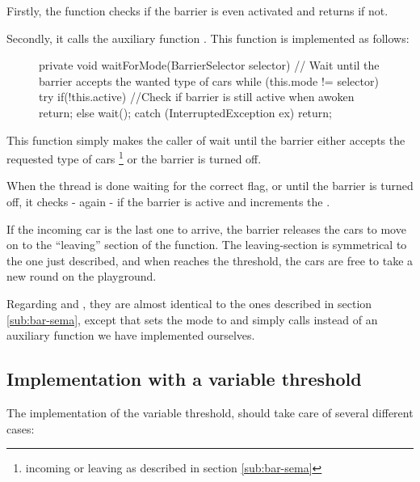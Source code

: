 Firstly, the function checks if the barrier is even activated and
returns if not.

Secondly, it calls the auxiliary function
. This function is implemented as follows:

\begin{figure}[H]
\begin{java}
private void waitForMode(BarrierSelector selector) {
	// Wait until the barrier accepts the wanted type of cars
	while (this.mode != selector) {
		try {
			if(!this.active) //Check if barrier is still active when awoken
				return;
			else
				wait();
		}
		catch (InterruptedException ex) { return; }
	}
}
\end{java}
\caption{}
\label{lst:bar-wait}
\end{figure}

This function simply makes the caller of  wait until the
barrier either accepts the requested type of cars \footnote{incoming
  or leaving as described in section \ref{sub:bar-sema}} or the
barrier is turned off.

When the thread is done waiting for the correct flag, or until the
barrier is turned off, it checks - again - if the barrier is active
and increments the .

If the incoming car is the last one to arrive, the barrier releases
the cars to move on to the ``leaving'' section of the function. The
leaving-section is symmetrical to the one just described, and when
 reaches the threshold, the cars are free to take a
new round on the playground.

Regarding  and , they are almost identical to
the ones described in section \ref{sub:bar-sema}, except that
 sets the mode to  and
simply calls  instead of an auxiliary function we
have implemented ourselves.


\subsection{Implementation with a variable threshold}
\label{sub:bar-thres}
The implementation of the variable threshold, should take care of
several different cases:

